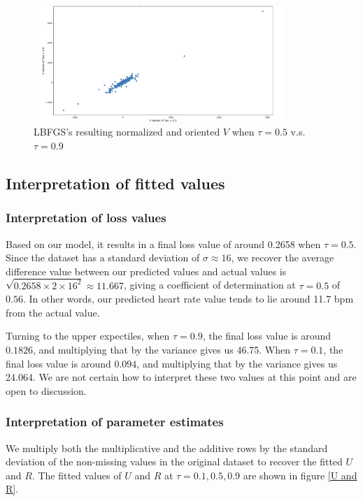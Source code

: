 \documentclass{article}
\begin{document}
\begin{figure}[H]
\centering
\includegraphics[width=0.85\textwidth]{outlier.png} 
\caption{LBFGS's resulting normalized and oriented $V$ when $\tau = 0.5$ v.s. $\tau = 0.9$} 
\label{outlier} 
\end{figure}



\subsection{Interpretation of fitted values}

\subsubsection{Interpretation of loss values}

Based on our model, it results in a final loss value of around 0.2658 when $\tau = 0.5$. Since the dataset has a standard deviation of $\sigma \approx 16$, we recover the average difference value between our predicted values and actual values is $\sqrt{0.2658 \times 2 \times 16^2} \approx 11.667$, giving a coefficient of determination at $\tau=0.5$ of $0.56$. In other words, our predicted heart rate value tends to lie around 11.7 bpm from the actual value.

Turning to the upper expectiles, when $\tau = 0.9$, the final loss value is around $0.1826$, and multiplying that by the variance gives us 46.75. When $\tau = 0.1$, the final loss value is around $0.094$, and multiplying that by the variance gives us 24.064. We are not certain how to interpret these two values at this point and are open to discussion. 

\subsubsection{Interpretation of parameter estimates}

We multiply both the multiplicative and the additive rows by the standard deviation of the non-missing values in the original dataset to recover the fitted $U$ and $R$. The fitted values of $U$ and $R$ at $\tau=0.1, 0.5, 0.9$ are shown in figure \ref{U and R}.
\end{document}
